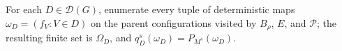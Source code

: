 For each \(D\in\mathcal D(G)\), enumerate every tuple of deterministic maps \(\omega_D=(f_V:V\in D)\) on the parent configurations visited by \(B_\rho\), \(E\), and \(\mathcal P\); the resulting finite set is \(\Omega_D\), and \(q_D^s(\omega_D)=P_{M^s}(\omega_D)\).
